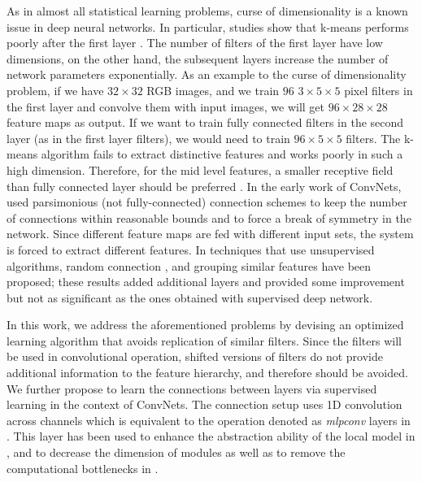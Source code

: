 \documentclass{article} \usepackage{iclr2016_workshop,times}
\begin{document}
As in almost all statistical learning problems, curse of dimensionality is a known issue in deep neural networks.
In particular, studies show that  k-means performs poorly after the first layer \citep{coates2011selecting}. 
The number of filters of the first layer have low dimensions, on the other hand, the subsequent layers increase the number of network parameters exponentially.
As an example to the curse of dimensionality problem, if we have $32\times32$ RGB images, and we train $96$ $3\times5\times5$ pixel filters in the first layer and convolve them with input images, we will get $96\times28\times28$ feature maps as output.
If we want to train fully connected filters in the second layer (as in the first layer filters), we would need to train $96\times5\times5$ filters.
The k-means algorithm fails to extract distinctive features and works poorly in such a high dimension. Therefore, for the mid level features, a smaller receptive field than fully connected layer should be preferred \citep{coates2011selecting}.
In the early work of ConvNets, \citet{lecun1998gradient} used parsimonious (not fully-connected) connection schemes to keep the number of connections within reasonable bounds and to force a break of symmetry in the network. Since different feature maps are fed with different input sets, the system is forced to extract different features. 
In techniques that use unsupervised algorithms, random connection \citep{culurciello2013analysis}, and grouping similar features \citep{coates2011selecting} have been proposed; these results added additional layers and provided some improvement but not as significant as the ones obtained with supervised deep network.




In this work, we address the aforementioned problems
by devising an optimized learning algorithm that avoids replication of similar filters. Since the filters will be used in convolutional operation, shifted versions of filters do not provide additional information to the feature hierarchy, and therefore should be avoided. 
We further propose to learn the connections between layers via supervised learning in the context of ConvNets. The connection setup uses 1D convolution across channels which is equivalent to the operation denoted as \emph{mlpconv} layers in \citet{lin_2013_nin}.
This layer has been used to enhance the abstraction ability of the local model in \citet{lin_2013_nin}, and to decrease the dimension of modules as well as to remove the computational bottlenecks in \citet{szegedy2014going}.
\end{document}

